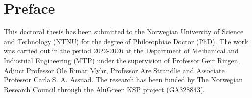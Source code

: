 \chapter*{Preface}

This doctoral thesis has been submitted to the Norwegian University of Science and Technology (NTNU) for the degree of Philosophiae Doctor (PhD). The work was carried out in the period 2022-2026 at the Department of Mechanical and Industrial Engineering (MTP) under the supervision of Professor Geir Ringen, Adjuct Professor Ole Runar Myhr, Professor Are Strandlie and Associate Professor Carla S. A. Assuad. The research has been funded by The Norwegian Research Council through the AluGreen KSP project (GA328843).

